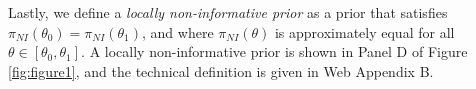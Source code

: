 \documentclass[AMA,STIX1COL,doublespace]{WileyNJD-v2}
\begin{document}
Lastly, we define a \textit{locally non-informative prior} as a prior that satisfies $\pi_{NI}(\theta_0) = \pi_{NI}(\theta_1)$, and where $\pi_{NI}(\theta)$ is approximately equal for all $\theta \in \left[\theta_0,\theta_1\right]$.
A locally non-informative prior is shown in Panel D of Figure \ref{fig:figure1}, and the technical definition is given in Web Appendix B.
\end{document}
